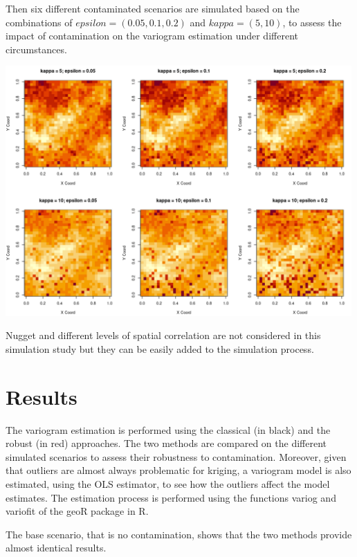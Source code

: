 \documentclass[
  12pt]{article}
\begin{document}
Then six different contaminated scenarios are simulated based on the
combinations of \(epsilon = (0.05, 0.1, 0.2)\) and \(kappa = (5, 10)\),
to assess the impact of contamination on the variogram estimation under
different circumstances.

\begin{center}
\includegraphics[width=5.20833in,height=\textheight]{img/cgrf.png}
\end{center}

Nugget and different levels of spatial correlation are not considered in
this simulation study but they can be easily added to the simulation
process.

\section{Results}\label{results}

The variogram estimation is performed using the classical (in black) and
the robust (in red) approaches. The two methods are compared on the
different simulated scenarios to assess their robustness to
contamination. Moreover, given that outliers are almost always
problematic for kriging, a variogram model is also estimated, using the
OLS estimator, to see how the outliers affect the model estimates. The
estimation process is performed using the functions variog and variofit
of the geoR package in R.

The base scenario, that is no contamination, shows that the two methods
provide almost identical results.
\end{document}
